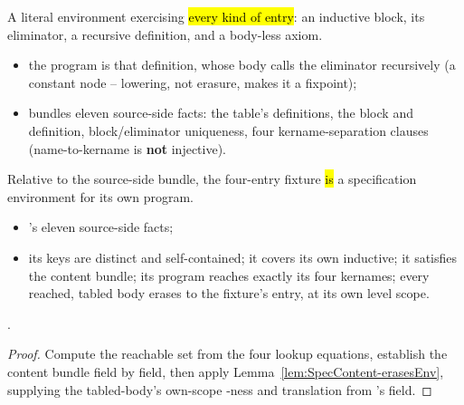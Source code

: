\begin{definition}
\label{def:demoEnv}
\leanok
{}
 A literal environment exercising \hl{every kind of entry}: an inductive block, its  eliminator, a recursive definition, and a body-less axiom.
\begin{itemize}
\item the program is that definition, whose body calls the eliminator recursively (a constant node -- lowering, not erasure, makes it a fixpoint);
\item {} bundles eleven source-side facts: the table's definitions, the block and definition, block/eliminator uniqueness, four kername-separation clauses (name-to-kername is \textbf{not} injective).
\end{itemize}
\end{definition}

\begin{theorem}
\label{thm:demoEnv_erasesEnv}
\leanok
{}
 Relative to the source-side bundle, the four-entry fixture \hl{is} a specification environment for its own program.
\begin{itemize}
\item {} 's eleven source-side facts;
\item {} its keys are distinct and self-contained; it covers its own inductive; it satisfies the content bundle; its program reaches exactly its four kernames; every reached, tabled body erases to the fixture's entry, at its own level scope.
\end{itemize}
 \stProved{}.
\end{theorem}
\begin{proof}
\leanok
{}
 Compute the reachable set from the four lookup equations, establish the content
bundle field by field, then apply Lemma~\ref{lem:SpecContent-erasesEnv}, supplying the
tabled-body's own-scope -ness and translation from 's
 field.
\end{proof}

